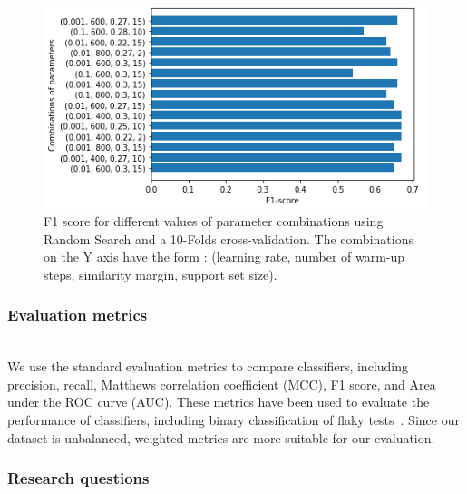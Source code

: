 \begin{figure}[htbp]
\centering
\includegraphics[scale=0.9]{figures/flakycat/parameters.PNG}
\caption{F1 score for different values of parameter combinations using Random Search and a 10-Folds cross-validation. The combinations on the Y axis have the form : (learning rate, number of warm-up steps, similarity margin, support set size). }
\label{fig:parameters}
\end{figure}

\subsubsection{Evaluation metrics}
~~ \\
We use the standard evaluation metrics to compare classifiers, including precision, recall, Matthews correlation coefficient (MCC), F1 score, and Area under the ROC curve (AUC).
These metrics have been used to evaluate the performance of classifiers, including binary classification of flaky tests~\cite{Pinto2020,camara2021use,fatima2021flakify}.
Since our dataset is unbalanced, weighted metrics are more suitable for our evaluation. 

\subsubsection{Research questions}


